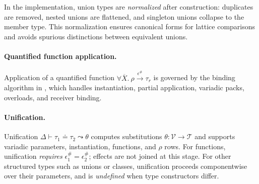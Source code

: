 In the implementation, union types are \emph{normalized} after construction: duplicates are removed, nested unions are flattened, and singleton unions collapse to the member type.  
This normalization ensures canonical forms for lattice comparisons and avoids spurious distinctions between equivalent unions.

\paragraph{Quantified function application.}
Application of a quantified function $\forall\overline{X}.~\rho \xrightarrow{\epsilon^\#} \tau_r$
is governed by the binding algorithm in ,
which handles instantiation, partial application, variadic packs, overloads, and receiver binding.
\paragraph{Unification.}  
Unification $\Delta \vdash \tau_1 \doteq \tau_2 \leadsto \theta$ computes substitutions $\theta : \mathcal{V} \to \mathcal{T}$ and supports variadic parameters, instantiation, functions, and $\rho$ rows.  
For functions, unification \emph{requires} $\epsilon^\#_1 = \epsilon^\#_2$; effects are not joined at this stage.  
For other structured types such as unions or classes, unification proceeds componentwise over their parameters, and is \emph{undefined} when type constructors differ.

